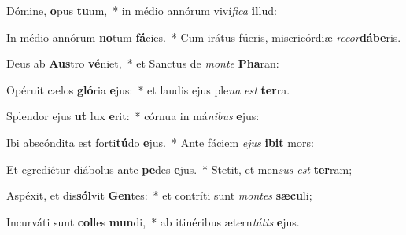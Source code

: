 \item Dómine, \textbf{o}pus \textbf{tu}um,~* in médio annórum viví\textit{fi}\textit{ca} \textbf{il}lud:
\item In médio annórum \textbf{no}tum \textbf{fá}cies.~* Cum irátus fúeris, misericórdiæ \textit{re}\textit{cor}\textbf{dá}\textbf{be}ris.
\item Deus ab \textbf{Aus}tro \textbf{vé}niet,~* et Sanctus de \textit{mon}\textit{te} \textbf{Pha}ran:
\item Opéruit cælos \textbf{gló}ria \textbf{e}jus:~* et laudis ejus ple\textit{na} \textit{est} \textbf{ter}ra.
\item Splendor ejus \textbf{ut} lux \textbf{e}rit:~* córnua in má\textit{ni}\textit{bus} \textbf{e}jus:
\item Ibi abscóndita est forti\textbf{tú}do \textbf{e}jus.~* Ante fáciem \textit{e}\textit{jus} \textbf{i}\textbf{bit} mors:
\item Et egrediétur diábolus ante \textbf{pe}des \textbf{e}jus.~* Stetit, et men\textit{sus} \textit{est} \textbf{ter}ram;
\item Aspéxit, et dis\textbf{sól}vit \textbf{Gen}tes:~* et contríti sunt \textit{mon}\textit{tes} \textbf{sæ}\textbf{cu}li;
\item Incurváti sunt \textbf{col}les \textbf{mun}di,~* ab itinéribus ætern\textit{tá}\textit{tis} \textbf{e}jus.
